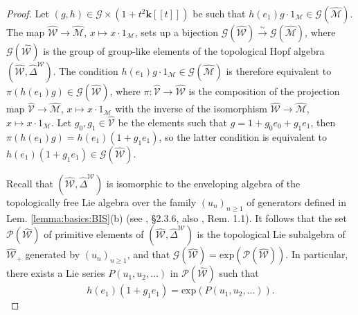 \documentclass[10pt]{amsart}
\numberwithin{equation}{subsection}
\begin{document}
\begin{proof}
Let $(g,h) \in \mathcal G\times(1+t^2\mathbf k[[t]])$ be such that $h(e_1)g\cdot 1_{\mathcal M}\in
\mathcal G(\hat{\mathcal M})$. The map $\hat{\mathcal W}\to\hat{\mathcal M}$, $x\mapsto x\cdot 1_{\mathcal M}$, sets up a 
bijection $\mathcal G(\hat{\mathcal W})\stackrel{\sim}{\to}\mathcal G(\hat{\mathcal M})$, where $\mathcal G(\hat{\mathcal W})$ is 
the group of group-like elements of the topological Hopf algebra $(\hat{\mathcal W},\hat\Delta^{\mathcal W})$. The condition 
$h(e_1)g\cdot 1_{\mathcal M} \in \mathcal G(\hat{\mathcal M})$ is therefore equivalent to $\pi(h(e_1)g)\in\mathcal G(\hat{\mathcal W})$, 
where $\pi : \hat{\mathcal V}\to\hat{\mathcal W}$ is the composition of the projection map 
$\hat{\mathcal V}\to\hat{\mathcal M}$, $x\mapsto x\cdot 1_{\mathcal M}$ with the inverse of the isomorphism 
$\hat{\mathcal W}\to\hat{\mathcal M}$, $x\mapsto x\cdot 1_{\mathcal M}$. Let $g_0,g_1\in\hat{\mathcal V}$ be the elements such that 
$g=1+g_0e_0+g_1e_1$, then $\pi(h(e_1)g)=h(e_1)(1+g_1e_1)$, so the latter condition is equivalent to 
$h(e_1)(1+g_1e_1)\in\mathcal G(\hat{\mathcal W})$. 

Recall that $(\hat{\mathcal W},\hat\Delta^{\mathcal W})$ is isomorphic to the enveloping algebra of the topologically free Lie algebra 
over the family $(u_n)_{n\geq 1}$ of generators defined in Lem. \ref{lemma:basics:BIS}(b) (see \cite{R}, \S 2.3.6, also \cite{EF1}, Rem. 1.1). 
It follows that the set $\mathcal P(\hat{\mathcal W})$ of primitive elements of $(\hat{\mathcal W},\hat\Delta^{\mathcal W})$ is the 
topological Lie subalgebra of $\hat{\mathcal W}_+$ generated by $(u_n)_{n\geq 1}$, and that 
$\mathcal G(\hat{\mathcal W})=\mathrm{exp}(\mathcal P(\hat{\mathcal W}))$. In particular, 
there exists a Lie series $P(u_1,u_2,\ldots)$ in $\mathcal P(\hat{\mathcal W})$ such that 
\begin{equation}\label{EQUALITy:BIS}
h(e_1)(1+g_1e_1)=\mathrm{exp}(P(u_1,u_2,\ldots)). 
\end{equation}


\end{proof}
\end{document}
